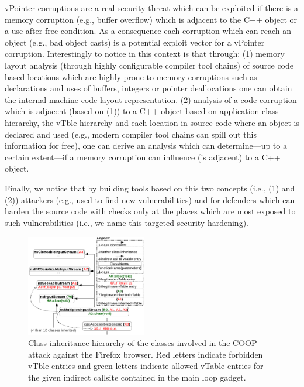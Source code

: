 vPointer corruptions are a real security threat which can be exploited if there 
is a memory corruption (e.g., buffer overflow) which is adjacent to
the C++ object or a use-after-free condition. As a consequence each corruption 
which can reach an object (e.g., bad object casts) is a potential exploit vector 
for a vPointer corruption. Interestingly to notice in this context is that through:
(1) memory layout analysis (through highly configurable compiler tool chains) of 
source code based locations which are highly prone to
memory corruptions such as declarations and uses of buffers, integers or pointer 
deallocations one can obtain the internal machine code layout representation.
(2) analysis of a code corruption which is adjacent (based on (1)) to a C++ object based on
application class hierarchy, the vTble hierarchy and each location in source code where an object
is declared and used (e.g., modern compiler tool chains can spill out this information for free), 
one can derive an analysis which can determine---up to a certain extent---if a memory corruption 
can influence (is adjacent) to a C++ object.

Finally, we notice that by building tools based on this two concepts (i.e., (1) and (2))
attackers (e.g., used to find new vulnerabilities) and for defenders which can 
harden the source code with checks only at the places which are most exposed 
to such vulnerabilities (i.e., we name this targeted security hardening).

\begin{figure}[h!]
    \centering
    \includegraphics[width=0.47\textwidth]{figures/class_hierarchy.pdf}
\caption{Class inheritance hierarchy of the classes involved in the COOP attack against the Firefox browser. Red letters 
indicate forbidden vTble entries and green letters indicate allowed vTable entries for the given indirect callsite
contained in the main loop gadget.}
\label{Class exploit}
\end{figure}

